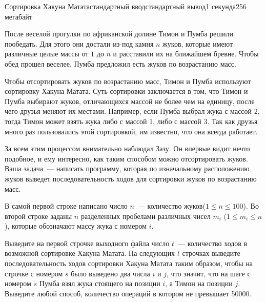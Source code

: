 \begin{problem}{Сортировка Хакуна Матата}{стандартный ввод}{стандартный вывод}{1 секунда}{256 мегабайт}

После веселой прогулки по африканской долине Тимон и Пумба решили пообедать. 
Для этого они достали из-под камня $n$ жуков, которые имеют 
различные целые массы от $1$ до $n$ и расставили их на ближайшем
бревне. Чтобы обед прошел веселее, Пумба предложил есть жуков по возрастанию масс. 

Чтобы отсортировать жуков по возрастанию масс, Тимон и Пумба используют сортировку Хакуна Матата.
Суть сортировки заключается в том, что Тимон и Пумба выбирают жуков, отличающихся массой не более чем на единицу, 
после чего друзья меняют их местами. Например, если Пумба выбрал жука с массой 2,
тогда Тимон может взять жука либо с массой 1, либо с массой 3. Так как друзья много раз пользовались 
этой сортировкой, им известно, что она всегда работает.
 
За всем этим процессом внимательно наблюдал Зазу. Он впервые видит нечто подобное, и ему интересно, как 
таким способом можно отсортировать жуков. Ваша задача~--- написать программу, которая по изначальному расположению жуков
выведет последовательность ходов для сортировки жуков по возрастанию масс.

\InputFile
В самой первой строке написано число $n$~--- количество жуков($1 \le n \le 100$).
Во второй строке заданы $n$ разделенных пробелами различных чисел $m_i$ ($1 \le m_i \le n$), которые обозначают массу жука 
с номером $i$.

\OutputFile
Выведите на первой строчке выходного файла число $t$~--- количество ходов в возможной сортировке Хакуна Матата.
На следующих $t$ строчках выведите последовательность ходов сортировки Хакуна Матата таким образом, чтобы на строчке 
с номером $s$ было выведено два числа $i$ и $j$, что значит, что на шаге с номером $s$ Пумба взял жука 
стоящего на позиции $i$, а Тимон на позиции $j$. Выведите любой способ, количество операций в котором не превышает 50000.


\Example

\begin{example}
%
\end{example}

\end{problem}

